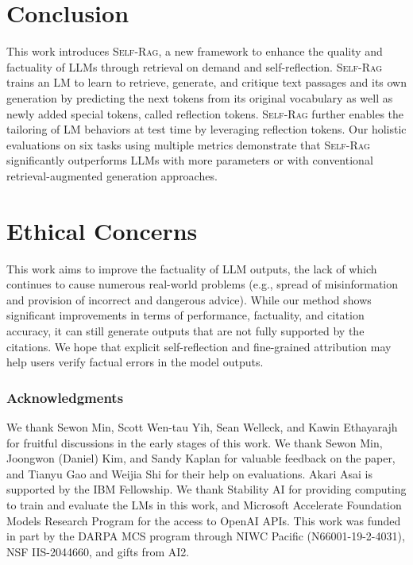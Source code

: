 \documentclass{article} %
\newcommand{\model}{\textsc{Self-Rag}\xspace}
\begin{document}
\section{Conclusion}

This work introduces \model, a new framework to enhance the quality and factuality of LLMs through retrieval on demand and self-reflection. 
\model trains an LM to learn to retrieve, generate, and critique text passages and its own generation by predicting the next tokens from its original vocabulary as well as newly added special tokens, called reflection tokens. 
\model further enables the tailoring of LM behaviors at test time by leveraging reflection tokens. 
Our holistic evaluations on six tasks using multiple metrics demonstrate that \model significantly outperforms LLMs with more parameters or with conventional retrieval-augmented generation approaches. 

\section*{Ethical Concerns}
This work aims to improve the factuality of LLM outputs, the lack of which continues to cause numerous real-world problems (e.g., spread of misinformation and provision of incorrect and dangerous advice). While our method shows significant improvements in terms of performance, factuality, and citation accuracy, it can still generate outputs that are not fully supported by the citations. 
We hope that explicit self-reflection and fine-grained attribution may help users verify factual errors in the model outputs. 






\subsubsection*{Acknowledgments}
We thank Sewon Min, Scott Wen-tau Yih, Sean Welleck, and Kawin Ethayarajh for fruitful discussions in the early stages of this work. 
We thank Sewon Min, Joongwon (Daniel) Kim, and Sandy Kaplan for valuable feedback on the paper, and Tianyu Gao and Weijia Shi for their help on evaluations. 
Akari Asai is supported by the IBM Fellowship. 
We thank Stability AI for providing computing to train and evaluate the LMs in this work, and Microsoft Accelerate Foundation Models Research Program for the access to OpenAI APIs. 
This work was funded in part by the DARPA MCS program through NIWC Pacific (N66001-19-2-4031), NSF IIS-2044660, and gifts from AI2.
\end{document}
